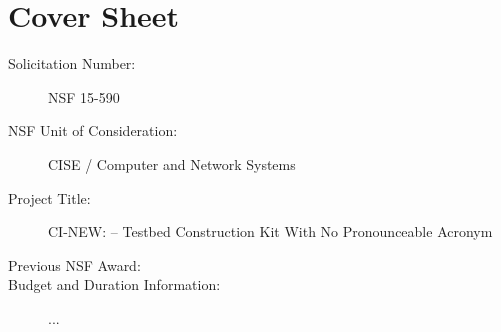 
\section*{Cover Sheet}

\begin{description}
  \item[Solicitation Number:] NSF 15-590
  \item[NSF Unit of Consideration:] CISE / Computer and Network Systems
  \item[Project Title:] CI-NEW: \sysname -- Testbed Construction Kit With No Pronounceable Acronym
  \item[Previous NSF Award:] 
  \item[Budget and Duration Information:] ...
\end{description}

\newpage

